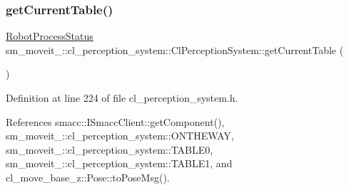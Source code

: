 \subsubsection{\texorpdfstring{get\+Current\+Table()}{getCurrentTable()}}
{\footnotesize\ttfamily \hyperlink{namespacesm__moveit__3_1_1cl__perception__system_a627f57ce4b1b2a0daa56d1b3c51c37ec}{Robot\+Process\+Status} sm\+\_\+moveit\+\_\+::cl\+\_\+perception\+\_\+system\+::\+Cl\+Perception\+System\+::get\+Current\+Table (\begin{DoxyParamCaption}{ }\end{DoxyParamCaption})\hspace{0.3cm}{\ttfamily [inline]}}



Definition at line 224 of file cl\+\_\+perception\+\_\+system.\+h.



References smacc\+::\+I\+Smacc\+Client\+::get\+Component(), sm\+\_\+moveit\+\_\+::cl\+\_\+perception\+\_\+system\+::\+O\+N\+T\+H\+E\+W\+AY, sm\+\_\+moveit\+\_\+::cl\+\_\+perception\+\_\+system\+::\+T\+A\+B\+L\+E0, sm\+\_\+moveit\+\_\+::cl\+\_\+perception\+\_\+system\+::\+T\+A\+B\+L\+E1, and cl\+\_\+move\+\_\+base\+\_\+z\+::\+Pose\+::to\+Pose\+Msg().



